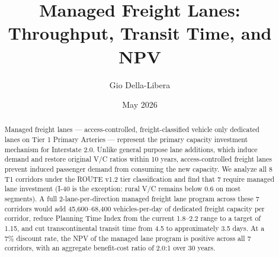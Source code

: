 \documentclass[12pt]{article}
\title{Managed Freight Lanes: Throughput, Transit Time, and NPV}
\author{Gio Della-Libera}
\date{May 2026}
\begin{document}
\maketitle
\begin{abstract}
Managed freight lanes --- access-controlled, freight-classified vehicle only dedicated lanes on Tier 1 Primary Arteries --- represent the primary capacity investment mechanism for Interstate 2.0. Unlike general purpose lane additions, which induce demand and restore original V/C ratios within 10 years, access-controlled freight lanes prevent induced passenger demand from consuming the new capacity. We analyze all 8 T1 corridors under the ROUTE v1.2 tier classification and find that 7 require managed lane investment (I-40 is the exception: rural V/C remains below 0.6 on most segments). A full 2-lane-per-direction managed freight lane program across these 7 corridors would add 45,600--68,400 vehicles-per-day of dedicated freight capacity per corridor, reduce Planning Time Index from the current 1.8--2.2 range to a target of 1.15, and cut transcontinental transit time from 4.5 to approximately 3.5 days. At a 7\% discount rate, the NPV of the managed lane program is positive across all 7 corridors, with an aggregate benefit-cost ratio of 2.0:1 over 30 years.
\end{abstract}









\end{document}

